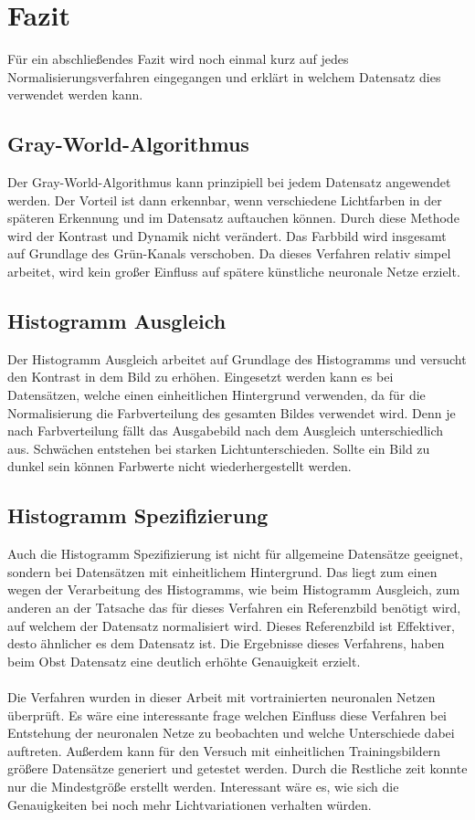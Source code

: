 \documentclass[a4paper,12pt,oneside]{article}
\begin{document}
  \section{Fazit}\label{s.fazit}
Für ein abschließendes Fazit wird noch einmal kurz auf jedes Normalisierungsverfahren eingegangen und erklärt in welchem Datensatz dies verwendet werden kann.
\subsection{Gray-World-Algorithmus}
Der Gray-World-Algorithmus kann prinzipiell bei jedem Datensatz angewendet werden. Der Vorteil ist dann erkennbar, wenn verschiedene Lichtfarben in der späteren Erkennung und im Datensatz auftauchen können. Durch diese Methode wird der Kontrast und Dynamik nicht verändert. Das Farbbild wird insgesamt auf Grundlage des Grün-Kanals verschoben. Da dieses Verfahren relativ simpel arbeitet, wird kein großer Einfluss auf spätere künstliche neuronale Netze erzielt.
\subsection{Histogramm Ausgleich}
Der Histogramm Ausgleich arbeitet auf Grundlage des Histogramms und versucht den Kontrast in dem Bild zu erhöhen. Eingesetzt werden kann es bei Datensätzen, welche einen einheitlichen Hintergrund verwenden, da für die Normalisierung die Farbverteilung des gesamten Bildes verwendet wird. Denn je nach Farbverteilung fällt das Ausgabebild nach dem Ausgleich unterschiedlich aus. Schwächen entstehen bei starken Lichtunterschieden. Sollte ein Bild zu dunkel sein können Farbwerte nicht wiederhergestellt werden.
\subsection{Histogramm Spezifizierung}
Auch die Histogramm Spezifizierung ist nicht für allgemeine Datensätze geeignet, sondern bei Datensätzen mit einheitlichem Hintergrund. Das liegt zum einen wegen der Verarbeitung des Histogramms, wie beim Histogramm Ausgleich, zum anderen an der Tatsache das für dieses Verfahren ein Referenzbild benötigt wird, auf welchem der Datensatz normalisiert wird. Dieses Referenzbild ist Effektiver, desto ähnlicher es dem Datensatz ist. Die Ergebnisse dieses Verfahrens, haben beim Obst Datensatz eine deutlich erhöhte Genauigkeit erzielt.\\\\
Die Verfahren wurden in dieser Arbeit mit vortrainierten neuronalen Netzen überprüft. Es wäre eine interessante frage welchen Einfluss diese Verfahren bei Entstehung der neuronalen Netze zu beobachten und welche Unterschiede dabei auftreten. Außerdem kann für den Versuch mit einheitlichen Trainingsbildern größere Datensätze generiert und getestet werden. Durch die Restliche zeit konnte nur die Mindestgröße erstellt werden. Interessant wäre es, wie sich die Genauigkeiten bei noch mehr Lichtvariationen verhalten würden.  
  \newpage
  \printbibliography
  \newpage
\end{document}
